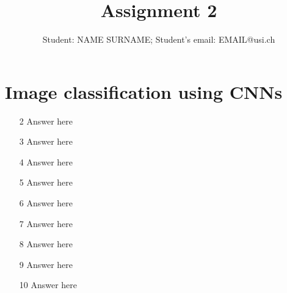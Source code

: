 \documentclass[a4paper]{article}
\title{Assignment 2}
\author{Student: NAME SURNAME; Student's email: EMAIL@usi.ch}
\begin{document}
\maketitle

\section*{Image classification using CNNs}
\begin{enumerate}
    \item[2] Answer here
    \item[3] Answer here
    \item[4] Answer here
    \item[5] Answer here
    \item[6] Answer here
    \item[7] Answer here
    \item[8]  Answer here
    \item[9]  Answer here
    \item[10] Answer here
    \end{enumerate}
\end{document}
